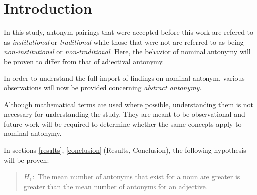 \section {Introduction}%
In this study, antonym pairings that were accepted before this work are refered to as \textit{institutional} or \textit{traditional} while those that were not are referred to as being \textit{non-institutional} or \textit{non-traditional}. Here, the behavior of nominal antonymy will be proven to differ from that of adjectival antonymy.  


In order to understand the full import of findings on nominal antonym, various observations will now be provided concerning \textit{abstract antonymy}. 

Although mathematical terms are used where possible, understanding them is not necessary for understanding the study.  They are meant to be observational and future work will be required to determine whether the same concepts apply to nominal antonymy.

In sections \ref{results}, \ref{conclusion} (Results, Conclusion), the following hypothesis will be proven:
	\begin{quote}
		$H_{1}:$ The mean number of antonyms that exist for a noun are greater is greater than the mean number of antonyms for an adjective.
	\end{quote}



